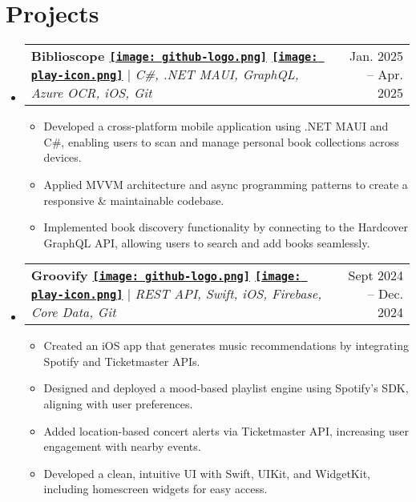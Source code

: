 \documentclass[letterpaper,11pt]{article}
\makeatletter
\newcommand{\resumeItem}[1]{
  \item\small{
    {#1 \vspace{-2pt}}
  }
}
\newcommand{\resumeProjectHeading}[2]{
    \item
    \begin{tabular*}{0.97\textwidth}{l@{\extracolsep{\fill}}r}
      \small#1 & #2 \\
    \end{tabular*}\vspace{-7pt}
}
\newcommand{\resumeSubHeadingListStart}{\begin{itemize}[leftmargin=0.15in, label={}]}
\newcommand{\resumeSubHeadingListEnd}{\end{itemize}}
\newcommand{\resumeItemListStart}{\begin{itemize}}
\newcommand{\resumeItemListEnd}{\end{itemize}\vspace{-5pt}}
\makeatother
\begin{document}
\section{Projects} 
    \resumeSubHeadingListStart
          \resumeProjectHeading
          {\textbf{{Biblioscope}
          \href{https://github.com/Adolfo-David-Romero/BiblioScope.git}{\texttt{[image: github-logo.png]}}
          \href{https://youtube.com/shorts/_l491A4mj3g}{\texttt{[image: play-icon.png]}}} 
          $|$ \emph{C\#, .NET MAUI, GraphQL, Azure OCR, iOS, Git}}{Jan. 2025 -- Apr. 2025}
          \resumeItemListStart
            \resumeItem{Developed a cross-platform mobile application using .NET MAUI and C\#, enabling users to scan and manage personal book collections across devices.}
            \resumeItem{Applied MVVM architecture and async programming patterns to create a responsive \& maintainable codebase.}
            \resumeItem{Implemented book discovery functionality by connecting to the Hardcover GraphQL API, allowing users to search and add books seamlessly.}
          \resumeItemListEnd
      \resumeProjectHeading
          {\textbf{{Groovify}
          \href{https://github.com/Adolfo-David-Romero/Groovify}{\texttt{[image: github-logo.png]}}
          \href{https://www.youtube.com/watch?v=jSiBa_nlCQs}{\texttt{[image: play-icon.png]}}} 
          $|$ \emph{REST API, Swift, iOS, Firebase, Core Data, Git}}{Sept 2024 -- Dec. 2024}
          \resumeItemListStart
            \resumeItem{Created an iOS app that generates music recommendations by integrating Spotify and Ticketmaster APIs.}
            \resumeItem{Designed and deployed a mood-based playlist engine using Spotify’s SDK, aligning with user preferences.}
            \resumeItem{Added location-based concert alerts via Ticketmaster API, increasing user engagement with nearby events.}
            \resumeItem{Developed a clean, intuitive UI with Swift, UIKit, and WidgetKit, including homescreen widgets for easy access.}
          \resumeItemListEnd
          
    \resumeSubHeadingListEnd


\end{document}
